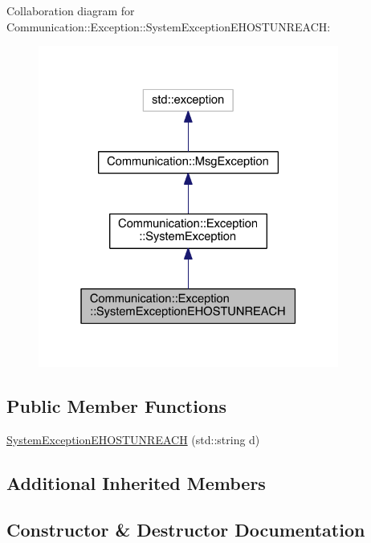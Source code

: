 Collaboration diagram for Communication\+:\+:Exception\+:\+:System\+Exception\+E\+H\+O\+S\+T\+U\+N\+R\+E\+A\+C\+H\+:\nopagebreak
\begin{figure}[H]
\begin{center}
\leavevmode
\includegraphics[width=280pt]{class_communication_1_1_exception_1_1_system_exception_e_h_o_s_t_u_n_r_e_a_c_h__coll__graph}
\end{center}
\end{figure}
\subsection*{Public Member Functions}
\begin{DoxyCompactItemize}
\item 
\hyperlink{class_communication_1_1_exception_1_1_system_exception_e_h_o_s_t_u_n_r_e_a_c_h_a22b0767b0511922e1c244f77565eeaf2}{System\+Exception\+E\+H\+O\+S\+T\+U\+N\+R\+E\+A\+C\+H} (std\+::string d)
\end{DoxyCompactItemize}
\subsection*{Additional Inherited Members}


\subsection{Constructor \& Destructor Documentation}
\hypertarget{class_communication_1_1_exception_1_1_system_exception_e_h_o_s_t_u_n_r_e_a_c_h_a22b0767b0511922e1c244f77565eeaf2}{}
